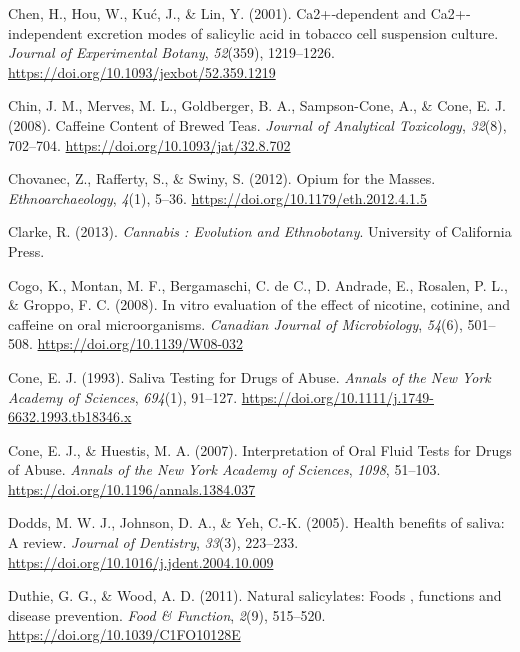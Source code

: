 \documentclass[
  11pt,
  leqno]{scrartcl}
\newlength{\cslhangindent}
\newenvironment{CSLReferences}[2] %
 {\begin{list}{}{%
  \setlength{\itemindent}{0pt}
  \setlength{\leftmargin}{0pt}
  \setlength{\parsep}{0pt}
  \ifodd #1
   \setlength{\leftmargin}{\cslhangindent}
   \setlength{\itemindent}{-1\cslhangindent}
  \fi
  \setlength{\itemsep}{#2\baselineskip}}}
 {\end{list}}
\begin{document}
\begin{CSLReferences}{1}{0}
Chen, H., Hou, W., Kuć, J., \& Lin, Y. (2001). Ca2+‐dependent and
{Ca2}+‐independent excretion modes of salicylic acid in tobacco cell
suspension culture. \emph{Journal of Experimental Botany},
\emph{52}(359), 1219--1226.
\url{https://doi.org/10.1093/jexbot/52.359.1219}

Chin, J. M., Merves, M. L., Goldberger, B. A., Sampson-Cone, A., \&
Cone, E. J. (2008). Caffeine {Content} of {Brewed Teas}. \emph{Journal
of Analytical Toxicology}, \emph{32}(8), 702--704.
\url{https://doi.org/10.1093/jat/32.8.702}

Chovanec, Z., Rafferty, S., \& Swiny, S. (2012). Opium for the {Masses}.
\emph{Ethnoarchaeology}, \emph{4}(1), 5--36.
\url{https://doi.org/10.1179/eth.2012.4.1.5}

Clarke, R. (2013). \emph{Cannabis : {Evolution} and {Ethnobotany}}.
{University of California Press}.

Cogo, K., Montan, M. F., Bergamaschi, C. de C., D. Andrade, E., Rosalen,
P. L., \& Groppo, F. C. (2008). In vitro evaluation of the effect of
nicotine, cotinine, and caffeine on oral microorganisms. \emph{Canadian
Journal of Microbiology}, \emph{54}(6), 501--508.
\url{https://doi.org/10.1139/W08-032}

Cone, E. J. (1993). Saliva {Testing} for {Drugs} of {Abuse}.
\emph{Annals of the New York Academy of Sciences}, \emph{694}(1),
91--127. \url{https://doi.org/10.1111/j.1749-6632.1993.tb18346.x}

Cone, E. J., \& Huestis, M. A. (2007). Interpretation of {Oral Fluid
Tests} for {Drugs} of {Abuse}. \emph{Annals of the New York Academy of
Sciences}, \emph{1098}, 51--103.
\url{https://doi.org/10.1196/annals.1384.037}

Dodds, M. W. J., Johnson, D. A., \& Yeh, C.-K. (2005). Health benefits
of saliva: A review. \emph{Journal of Dentistry}, \emph{33}(3),
223--233. \url{https://doi.org/10.1016/j.jdent.2004.10.009}

Duthie, G. G., \& Wood, A. D. (2011). Natural salicylates: Foods ,
functions and disease prevention. \emph{Food \& Function}, \emph{2}(9),
515--520. \url{https://doi.org/10.1039/C1FO10128E}


\end{CSLReferences}
\end{document}
